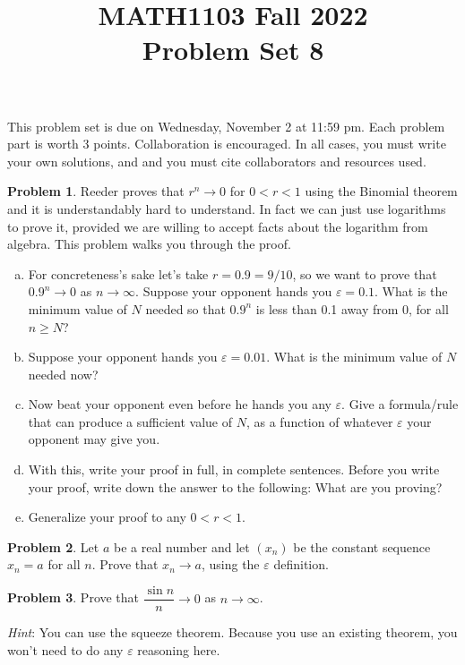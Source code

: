 \documentclass[11pt,oneside]{amsart}
\title{MATH1103 Fall 2022\\
Problem Set 8}
\theoremstyle{definition}
\newtheorem{problem}{Problem}
\theoremstyle{plain}
\newcommand{\eps}{\varepsilon}
\begin{document}
    \maketitle
    This problem set is due on Wednesday, November 2 at 11:59 pm. Each problem part is worth 3 points. Collaboration is encouraged. In all cases, you must write your own solutions, and and you must cite collaborators and resources used.

    \begin{problem}
        Reeder proves that $r^n\to 0$ for $0<r<1$ using the Binomial theorem and it is understandably hard to understand. In fact we can just use logarithms to prove it, provided we are willing to accept facts about the logarithm from algebra. This problem walks you through the proof.

        \begin{enumerate}[(a)]
            \item For concreteness's sake let's take $r=0.9=9/10$, so we want to prove that $0.9^n\to 0$ as $n\to\infty$. Suppose your opponent hands you $\eps=0.1$. What is the minimum value of $N$ needed so that $0.9^n$ is less than 0.1 away from 0, for all $n\geq N$?
            \item Suppose your opponent hands you $\eps=0.01$. What is the minimum value of $N$ needed now?
            \item Now beat your opponent even before he hands you any $\eps$. Give a formula/rule that can produce a sufficient value of $N$, as a function of whatever $\eps$ your opponent may give you.
            \item With this, write your proof in full, in complete sentences. Before you write your proof, write down the answer to the following: What are you proving?
            \item Generalize your proof to any $0<r<1$.
        \end{enumerate}
    \end{problem}

    \begin{problem}
        Let $a$ be a real number and let $(x_n)$ be the constant sequence $x_n=a$ for all $n$. Prove that $x_n\to a$, using the $\eps$ definition.
    \end{problem}

    \begin{problem}
        Prove that $\dfrac{\sin n}n\to 0$ as $n\to\infty$.
        
        \emph{Hint}: You can use the squeeze theorem. Because you use an existing theorem, you won't need to do any $\eps$ reasoning here.
    \end{problem}
\end{document}
